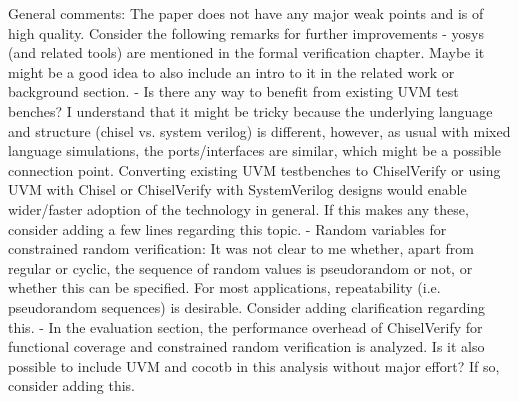 \documentclass{article}
\begin{document}
General comments:
The paper does not have any major weak points and is of high quality. Consider the following remarks for further improvements
- yosys (and related tools) are mentioned in the formal verification chapter. Maybe it might be a good idea to also include an intro to it in the related work or background section.
- Is there any way to benefit from existing UVM test benches? I understand that it might be tricky because the underlying language and structure (chisel vs. system verilog) is different, however, as usual with mixed language simulations, the ports/interfaces are similar, which might be a possible connection point. Converting existing UVM testbenches to ChiselVerify or using UVM with Chisel or ChiselVerify with SystemVerilog designs would enable wider/faster adoption of the technology in general. If this makes any these, consider adding a few lines regarding this topic.
- Random variables for constrained random verification: It was not clear to me whether, apart from regular or cyclic, the sequence of random values is pseudorandom or not, or whether this can be specified. For most applications, repeatability (i.e. pseudorandom sequences) is desirable. Consider adding clarification regarding this.
- In the evaluation section, the performance overhead of ChiselVerify for functional coverage and constrained random verification is analyzed. Is it also possible to include UVM and cocotb in this analysis without major effort? If so, consider adding this.
\end{document}

